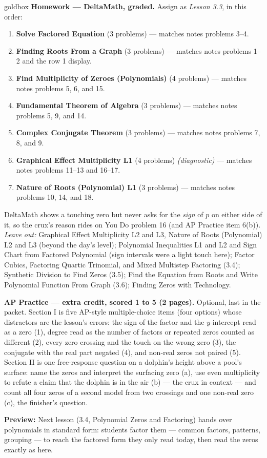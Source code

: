 \documentclass[10pt]{article}
\begin{document}
\begin{skillbox}{goldbox}
\textbf{Homework --- DeltaMath, graded.} Assign as \textit{Lesson 3.3}, in this order:
\begin{enumerate}[itemsep=1pt,topsep=2pt]
  \item \textbf{Solve Factored Equation} (3 problems) --- matches notes problems 3--4.
  \item \textbf{Finding Roots From a Graph} (3 problems) --- matches notes problems 1--2 and
        the row 1 display.
  \item \textbf{Find Multiplicity of Zeroes (Polynomials)} (4 problems) --- matches notes
        problems 5, 6, and 15.
  \item \textbf{Fundamental Theorem of Algebra} (3 problems) --- matches notes problems 5, 9,
        and 14.
  \item \textbf{Complex Conjugate Theorem} (3 problems) --- matches notes problems 7, 8, and 9.
  \item \textbf{Graphical Effect Multiplicity L1} (4 problems) \textit{(diagnostic)} ---
        matches notes problems 11--13 and 16--17.
  \item \textbf{Nature of Roots (Polynomial) L1} (3 problems) --- matches notes problems 10, 14,
        and 18.
\end{enumerate}
DeltaMath shows a touching zero but never asks for the \emph{sign} of $p$ on either side of
it, so the crux's reason rides on You Do problem 16 (and AP Practice item 6(b)).
\textit{Leave out:} Graphical Effect Multiplicity L2 and L3, Nature of Roots (Polynomial) L2 and
L3 (beyond the day's level); Polynomial Inequalities L1 and L2 and Sign Chart from Factored
Polynomial (sign intervals were a light touch here); Factor Cubics, Factoring Quartic Trinomial,
and Mixed Multistep Factoring (3.4); Synthetic Division to Find Zeros (3.5); Find the Equation
from Roots and Write Polynomial Function From Graph (3.6); Finding Zeros with Technology.

\textbf{AP Practice --- extra credit, scored 1 to 5 (2 pages).} Optional, last in the packet.
Section I is five AP-style multiple-choice items (four options) whose distractors are the
lesson's errors: the sign of the factor and the $y$-intercept read as a zero (1), degree read
as the number of factors or repeated zeros counted as different (2), every zero crossing and the
touch on the wrong zero (3), the conjugate with the real part negated (4), and non-real zeros
not paired (5). Section II is one free-response question on a dolphin's height above a pool's
surface: name the zeros and interpret the surfacing zero (a), use even multiplicity to refute a
claim that the dolphin is in the air (b) --- the crux in context --- and count all four zeros of
a second model from two crossings and one non-real zero (c), the finisher's question.

\textbf{Preview:} Next lesson (3.4, Polynomial Zeros and Factoring) hands over polynomials in
standard form: students factor them --- common factors, patterns, grouping --- to reach the
factored form they only read today, then read the zeros exactly as here.
\end{skillbox}
\end{document}
